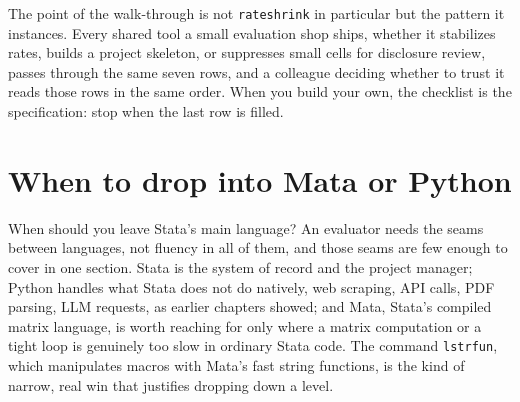 The point of the walk-through is not \texttt{rateshrink} in particular but the pattern it instances. Every shared tool a small evaluation shop ships, whether it stabilizes rates, builds a project skeleton, or suppresses small cells for disclosure review, passes through the same seven rows, and a colleague deciding whether to trust it reads those rows in the same order. When you build your own, the checklist is the specification: stop when the last row is filled.

\section{When to drop into Mata or Python}
When should you leave Stata's main language? An evaluator needs the seams between languages, not fluency in all of them, and those seams are few enough to cover in one section. Stata is the system of record and the project manager; Python handles what Stata does not do natively, web scraping, API calls, PDF parsing, LLM requests, as earlier chapters showed; and Mata, Stata's compiled matrix language, is worth reaching for only where a matrix computation or a tight loop is genuinely too slow in ordinary Stata code. The command \texttt{lstrfun}, which manipulates macros with Mata's fast string functions, is the kind of narrow, real win that justifies dropping down a level.

